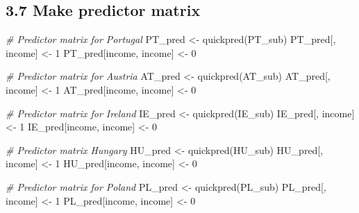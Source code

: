 \documentclass[
]{article}
\newenvironment{Shaded}{\begin{snugshade}}{\end{snugshade}}
\newcommand{\CommentTok}[1]{\textcolor[rgb]{0.56,0.35,0.01}{\textit{#1}}}
\newcommand{\DecValTok}[1]{\textcolor[rgb]{0.00,0.00,0.81}{#1}}
\newcommand{\FunctionTok}[1]{\textcolor[rgb]{0.00,0.00,0.00}{#1}}
\newcommand{\NormalTok}[1]{#1}
\newcommand{\OtherTok}[1]{\textcolor[rgb]{0.56,0.35,0.01}{#1}}
\newcommand{\StringTok}[1]{\textcolor[rgb]{0.31,0.60,0.02}{#1}}
\begin{document}
\hypertarget{make-predictor-matrix}{%
\subsection{3.7 Make predictor matrix}\label{make-predictor-matrix}}

\begin{Shaded}
\begin{Highlighting}[]
\CommentTok{\# Predictor matrix for Portugal}
\NormalTok{PT\_pred }\OtherTok{\textless{}{-}} \FunctionTok{quickpred}\NormalTok{(PT\_sub)}
\NormalTok{PT\_pred[, }\StringTok{\textquotesingle{}income\textquotesingle{}}\NormalTok{] }\OtherTok{\textless{}{-}} \DecValTok{1}
\NormalTok{PT\_pred[}\StringTok{\textquotesingle{}income\textquotesingle{}}\NormalTok{, }\StringTok{\textquotesingle{}income\textquotesingle{}}\NormalTok{] }\OtherTok{\textless{}{-}} \DecValTok{0}

\CommentTok{\# Predictor matrix for Austria}
\NormalTok{AT\_pred }\OtherTok{\textless{}{-}} \FunctionTok{quickpred}\NormalTok{(AT\_sub)}
\NormalTok{AT\_pred[, }\StringTok{\textquotesingle{}income\textquotesingle{}}\NormalTok{] }\OtherTok{\textless{}{-}} \DecValTok{1}
\NormalTok{AT\_pred[}\StringTok{\textquotesingle{}income\textquotesingle{}}\NormalTok{, }\StringTok{\textquotesingle{}income\textquotesingle{}}\NormalTok{] }\OtherTok{\textless{}{-}} \DecValTok{0}

\CommentTok{\# Predictor matrix for Ireland}
\NormalTok{IE\_pred }\OtherTok{\textless{}{-}} \FunctionTok{quickpred}\NormalTok{(IE\_sub)}
\NormalTok{IE\_pred[, }\StringTok{\textquotesingle{}income\textquotesingle{}}\NormalTok{] }\OtherTok{\textless{}{-}} \DecValTok{1}
\NormalTok{IE\_pred[}\StringTok{\textquotesingle{}income\textquotesingle{}}\NormalTok{, }\StringTok{\textquotesingle{}income\textquotesingle{}}\NormalTok{] }\OtherTok{\textless{}{-}} \DecValTok{0}

\CommentTok{\# Predictor matrix Hungary }
\NormalTok{HU\_pred }\OtherTok{\textless{}{-}} \FunctionTok{quickpred}\NormalTok{(HU\_sub)}
\NormalTok{HU\_pred[, }\StringTok{\textquotesingle{}income\textquotesingle{}}\NormalTok{] }\OtherTok{\textless{}{-}} \DecValTok{1}
\NormalTok{HU\_pred[}\StringTok{\textquotesingle{}income\textquotesingle{}}\NormalTok{, }\StringTok{\textquotesingle{}income\textquotesingle{}}\NormalTok{] }\OtherTok{\textless{}{-}} \DecValTok{0}

\CommentTok{\# Predictor matrix for Poland}
\NormalTok{PL\_pred }\OtherTok{\textless{}{-}} \FunctionTok{quickpred}\NormalTok{(PL\_sub)}
\NormalTok{PL\_pred[, }\StringTok{\textquotesingle{}income\textquotesingle{}}\NormalTok{] }\OtherTok{\textless{}{-}} \DecValTok{1}
\NormalTok{PL\_pred[}\StringTok{\textquotesingle{}income\textquotesingle{}}\NormalTok{, }\StringTok{\textquotesingle{}income\textquotesingle{}}\NormalTok{] }\OtherTok{\textless{}{-}} \DecValTok{0}
\end{Highlighting}
\end{Shaded}
\end{document}
